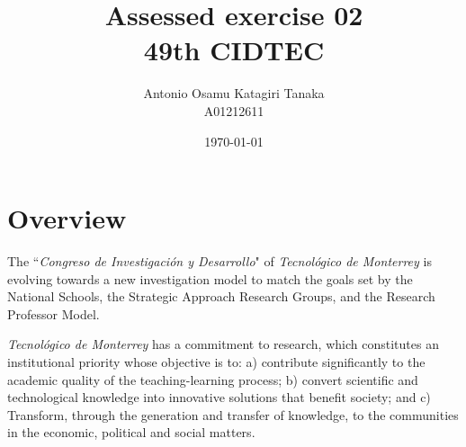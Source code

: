 \documentclass[11pt,a4paper]{article}
\title
{
    Assessed exercise 02\\
    49th CIDTEC
}
\author
{
    Antonio Osamu Katagiri Tanaka \\
    A01212611
}
\date{\today}
\providecommand{\keywords}[1]
{
    \\
    \\
    \small
    \textbf{\textit{Keywords:}} #1
}
\begin{document}

\maketitle



\clearpage


\tableofcontents
\clearpage


\listoftables
\clearpage

\section{Overview}\label{sec:overview}
The ``\emph{Congreso de Investigación y Desarrollo}" of \emph{Tecnológico de Monterrey} is evolving towards a new investigation model to match the goals set by the National Schools, the Strategic Approach Research Groups, and the Research Professor Model.

\emph{Tecnológico de Monterrey} has a commitment to research, which constitutes an institutional priority whose objective is to: a) contribute significantly to the academic quality of the teaching-learning process; b) convert scientific and technological knowledge into innovative solutions that benefit society; and c) Transform, through the generation and transfer of knowledge, to the communities in the economic, political and social matters.
\end{document}
